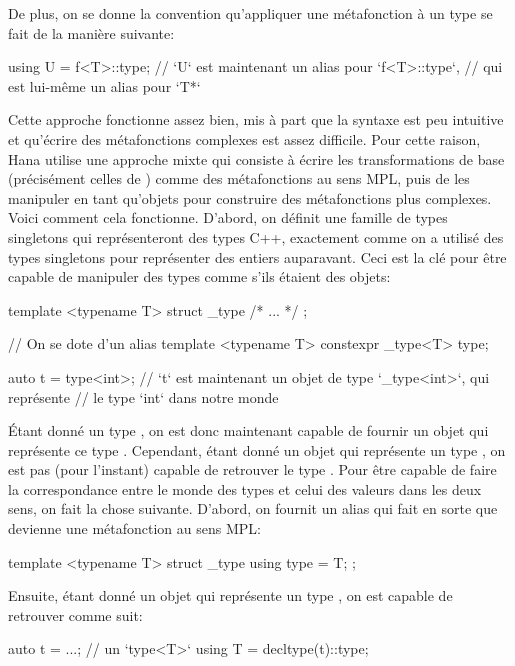 De plus, on se donne la convention qu'appliquer une métafonction  à
un type  se fait de la manière suivante:
\begin{cpp}
    using U = f<T>::type;
    // `U` est maintenant un alias pour `f<T>::type`,
    // qui est lui-même un alias pour `T*`
\end{cpp}

Cette approche fonctionne assez bien, mis à part que la syntaxe est peu
intuitive et qu'écrire des métafonctions complexes est assez difficile.
Pour cette raison, Hana utilise une approche mixte qui consiste à écrire les
transformations de base (précisément celles de ) comme des
métafonctions au sens MPL, puis de les manipuler en tant qu'objets pour
construire des métafonctions plus complexes. Voici comment cela fonctionne.
D'abord, on définit une famille de types singletons qui représenteront des types
C++, exactement comme on a utilisé des types singletons pour représenter des
entiers auparavant. Ceci est la clé pour être capable de manipuler des types
comme s'ils étaient des objets:
\begin{cpp}
    template <typename T>
    struct _type { /* ... */ };

    // On se dote d'un alias
    template <typename T>
    constexpr _type<T> type{};

    auto t = type<int>;
    // `t` est maintenant un objet de type `_type<int>`, qui représente
    // le type `int` dans notre monde
\end{cpp}

Étant donné un type , on est donc maintenant capable de fournir un
objet qui représente ce type . Cependant, étant donné un objet qui
représente un type , on est pas (pour l'instant) capable de retrouver
le type . Pour être capable de faire la correspondance entre le monde
des types et celui des valeurs dans les deux sens, on fait la chose suivante.
D'abord, on fournit un alias qui fait en sorte que  devienne
une métafonction au sens MPL:
\begin{cpp}
    template <typename T>
    struct _type {
        using type = T;
    };
\end{cpp}

Ensuite, étant donné un objet qui représente un type , on est capable
de retrouver  comme suit:
\begin{cpp}
    auto t = ...; // un `type<T>`
    using T = decltype(t)::type;
\end{cpp}

